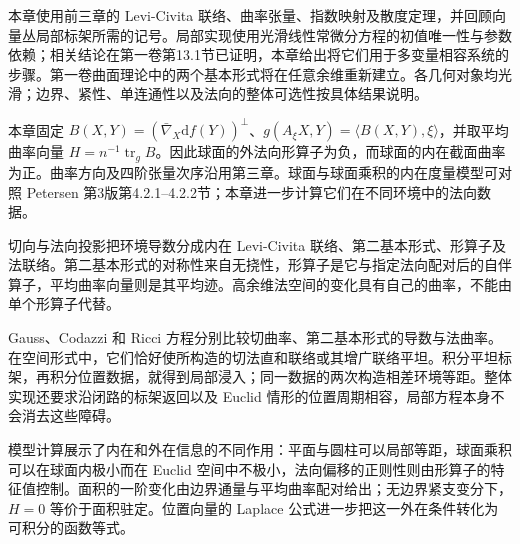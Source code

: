 \ProseParagraphBreak

本章使用前三章的 Levi-Civita 联络、曲率张量、指数映射及散度定理，并回顾向量丛局部标架所需的记号。局部实现使用光滑线性常微分方程的初值唯一性与参数依赖；相关结论在第一卷第13.1节已证明，本章给出将它们用于多变量相容系统的步骤。第一卷曲面理论中的两个基本形式将在任意余维重新建立。各几何对象均光滑；边界、紧性、单连通性以及法向的整体可选性按具体结果说明。

\ProseParagraphBreak

本章固定 \(B(X,Y)=(\bar\nabla_X\mathrm df(Y))^\perp\)、\(g(A_\xi X,Y)=\langle B(X,Y),\xi\rangle\)，并取平均曲率向量 \(H=n^{-1}\operatorname{tr}_g B\)。因此球面的外法向形算子为负，而球面的内在截面曲率为正。曲率方向及四阶张量次序沿用第三章。球面与球面乘积的内在度量模型可对照 Petersen 第3版第4.2.1--4.2.2节\cite[第4.2.1--4.2.2节]{Petersen2016}；本章进一步计算它们在不同环境中的法向数据。






\begin{chaptersummary}
	切向与法向投影把环境导数分成内在 Levi-Civita 联络、第二基本形式、形算子及法联络。第二基本形式的对称性来自无挠性，形算子是它与指定法向配对后的自伴算子，平均曲率向量则是其平均迹。高余维法空间的变化具有自己的曲率，不能由单个形算子代替。

	\ProseParagraphBreak

	Gauss、Codazzi 和 Ricci 方程分别比较切曲率、第二基本形式的导数与法曲率。在空间形式中，它们恰好使所构造的切法直和联络或其增广联络平坦。积分平坦标架，再积分位置数据，就得到局部浸入；同一数据的两次构造相差环境等距。整体实现还要求沿闭路的标架返回以及 Euclid 情形的位置周期相容，局部方程本身不会消去这些障碍。

	\ProseParagraphBreak

	模型计算展示了内在和外在信息的不同作用：平面与圆柱可以局部等距，球面乘积可以在球面内极小而在 Euclid 空间中不极小，法向偏移的正则性则由形算子的特征值控制。面积的一阶变化由边界通量与平均曲率配对给出；无边界紧支变分下，\(H=0\) 等价于面积驻定。位置向量的 Laplace 公式进一步把这一外在条件转化为可积分的函数等式。
\end{chaptersummary}

\BookExercises

